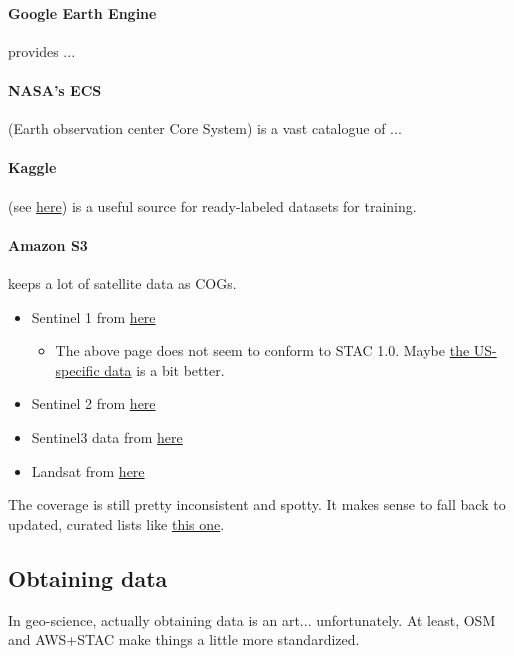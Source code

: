\paragraph{Google Earth Engine} provides ...

\paragraph{NASA's ECS} (Earth observation center Core System) is a vast catalogue of ...

\paragraph{Kaggle} (see \href{https://www.kaggle.com/search?q=sentinel}{here}) is a useful source for ready-labeled datasets for training.

\paragraph{Amazon S3} keeps a lot of satellite data as COGs. \begin{itemize}
    \item Sentinel 1 from \href{https://registry.opendata.aws/sentinel-1/}{here} \begin{itemize}
            \item The above page does not seem to conform to STAC 1.0. Maybe \href{https://raw.githubusercontent.com/scottyhq/sentinel1-rtc-stac/main/13SBD/catalog.json}{the US-specific data} is a bit better.
        \end{itemize}
    \item Sentinel 2 from \href{https://sentinel-cogs.s3.us-west-2.amazonaws.com/sentinel-s2-l2a-cogs/2020/S2A_36QWD_20200701_0_L2A/TCI.tif}{here}
\item Sentinel3 data from \href{https://github.com/Sentinel-5P/data-on-s3/blob/master/DocsForAws/Sentinel3Description.md}{here}                 
    \item Landsat from \href{https://landsat-pds.s3.amazonaws.com/c1/L8/139/045/LC08_L1TP_139045_20170304_20170316_01_T1/LC08_L1TP_139045_20170304_20170316_01_T1}{here}
\end{itemize}
The coverage is still pretty inconsistent and spotty. It makes sense to fall back to updated, curated lists like \href{https://github.com/Fernerkundung/awesome-sentinel}{this one}.


\subsection{Obtaining data}
In geo-science, actually obtaining data is an art... unfortunately. At least, OSM and AWS+STAC make things a little more standardized.

